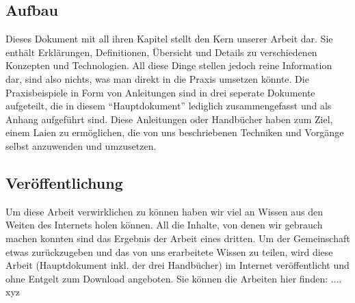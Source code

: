 \subsection{Aufbau}
Dieses Dokument mit all ihren Kapitel stellt den Kern unserer Arbeit dar. Sie enthält Erklärungen, Definitionen, Übersicht und Details zu verschiedenen Konzepten und Technologien. All diese Dinge stellen jedoch reine Information dar, sind also nichts, was man direkt in die Praxis umsetzen könnte. Die Praxisbeispiele in Form von Anleitungen sind in drei seperate Dokumente aufgeteilt, die in diesem ``Hauptdokument'' lediglich zusammengefasst und als Anhang aufgeführt sind. Diese Anleitungen oder Handbücher haben zum Ziel, einem Laien zu ermöglichen, die von uns beschriebenen Techniken und Vorgänge selbst anzuwenden und umzusetzen. 

\subsection{Veröffentlichung}
Um diese Arbeit verwirklichen zu können haben wir viel an Wissen aus den Weiten des Internets holen können. All die Inhalte, von denen wir gebrauch machen konnten sind das Ergebnis der Arbeit eines dritten. Um der Gemeinschaft etwas zurückzugeben und das von uns erarbeitete Wissen zu teilen, wird diese Arbeit (Hauptdokument inkl. der drei Handbücher) im Internet veröffentlicht und ohne Entgelt zum Download angeboten. 
Sie können die Arbeiten hier finden: .... xyz